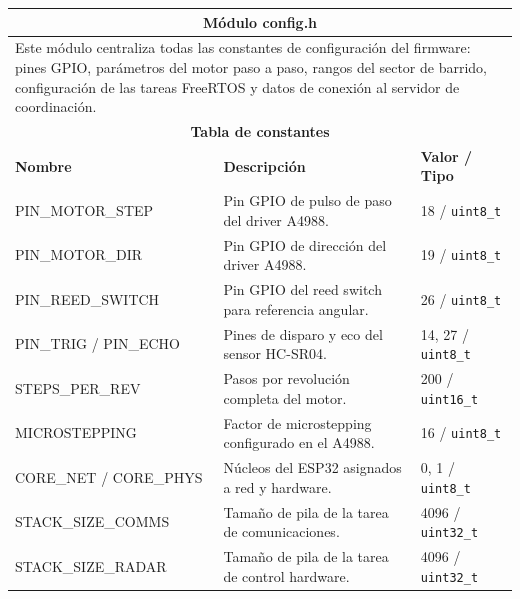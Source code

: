 

\begin{table}[h!]
\centering
\small
\renewcommand{\arraystretch}{1.25}
\begin{tabular}{|p{2.8cm}|p{5.8cm}|p{4.5cm}|}
\hline
\multicolumn{3}{|c|}{\textbf{Módulo config.h}} \\
\hline
\multicolumn{3}{|p{13.1cm}|}{Este módulo centraliza todas las constantes de
configuración del firmware: pines GPIO, parámetros del motor paso a paso,
rangos del sector de barrido, configuración de las tareas FreeRTOS y datos
de conexión al servidor de coordinación.} \\
\hline
\multicolumn{3}{|c|}{\textbf{Tabla de constantes}} \\
\hline
\textbf{Nombre} & \textbf{Descripción} & \textbf{Valor / Tipo} \\
\hline
PIN\_MOTOR\_STEP & Pin GPIO de pulso de paso del driver A4988. & 18 / \texttt{uint8\_t} \\
\hline
PIN\_MOTOR\_DIR & Pin GPIO de dirección del driver A4988. & 19 / \texttt{uint8\_t} \\
\hline
PIN\_REED\_SWITCH & Pin GPIO del reed switch para referencia angular. & 26 / \texttt{uint8\_t} \\
\hline
PIN\_TRIG / PIN\_ECHO & Pines de disparo y eco del sensor HC-SR04. & 14, 27 / \texttt{uint8\_t} \\
\hline
STEPS\_PER\_REV & Pasos por revolución completa del motor. & 200 / \texttt{uint16\_t} \\
\hline
MICROSTEPPING & Factor de microstepping configurado en el A4988. & 16 / \texttt{uint8\_t} \\
\hline
CORE\_NET / CORE\_PHYS & Núcleos del ESP32 asignados a red y hardware. & 0, 1 / \texttt{uint8\_t} \\
\hline
STACK\_SIZE\_COMMS & Tamaño de pila de la tarea de comunicaciones. & 4096 / \texttt{uint32\_t} \\
\hline
STACK\_SIZE\_RADAR & Tamaño de pila de la tarea de control hardware. & 4096 / \texttt{uint32\_t} \\

\end{tabular}
\end{table}

